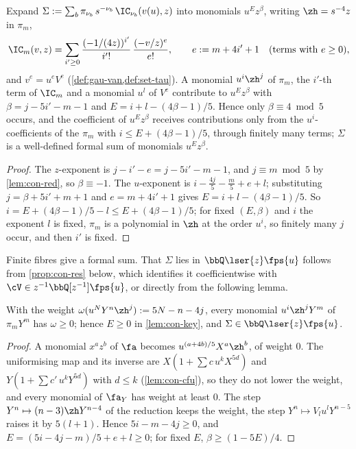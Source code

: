 
\begin{lem}
\label{lem:con-key}
Expand $\Sigma:=\sum_b\pi_{\nu_b}\,s^{-\nu_b}\,\IC_{\nu_b}(v(u),z)$ into monomials $u^Ez^\beta$, writing $\zh=s^{-4}z$ in $\pi_m$,
\[
\IC_m(v,z)=\sum_{i'\geq0}\frac{(-1/(4z))^{i'}}{i'!}\,\frac{(-v/z)^e}{e!},\qquad e:=m+4i'+1\quad(\text{terms with }e\geq0),
\]
and $v^e=u^eV^e$ (\cref{def:gau-van,def:set-tau}). A monomial $u^i\zh^j$ of $\pi_m$, the $i'$-th term of $\IC_m$ and a monomial $u^l$ of $V^e$ contribute to $u^Ez^\beta$ with $\beta=j-5i'-m-1$ and $E=i+l-(4\beta-1)/5$. Hence only $\beta\equiv4\bmod5$ occurs, and the coefficient of $u^Ez^\beta$ receives contributions only from the $u^i$-coefficients of the $\pi_m$ with $i\leq E+(4\beta-1)/5$, through finitely many terms; $\Sigma$ is a well-defined formal sum of monomials $u^Ez^\beta$.
\end{lem}

\begin{proof}
The $z$-exponent is $j-i'-e=j-5i'-m-1$, and $j\equiv m\bmod5$ by \cref{lem:con-red}, so $\beta\equiv-1$. The $u$-exponent is $i-\frac{4j}5-\frac m5+e+l$; substituting $j=\beta+5i'+m+1$ and $e=m+4i'+1$ gives $E=i+l-(4\beta-1)/5$. So $i=E+(4\beta-1)/5-l\leq E+(4\beta-1)/5$; for fixed $(E,\beta)$ and $i$ the exponent $l$ is fixed, $\pi_m$ is a polynomial in $\zh$ at the order $u^i$, so finitely many $j$ occur, and then $i'$ is fixed.
\end{proof}

Finite fibres give a formal sum. That $\Sigma$ lies in $\bbQ\lser{z}\fps{u}$ follows from \cref{prop:con-res} below, which identifies it coefficientwise with $\cV\in z^{-1}\bbQ[z^{-1}]\fps{u}$, or directly from the following lemma.

\begin{lem}
\label{lem:con-weight}
With the weight $\omega(u^NY^n\zh^j):=5N-n-4j$, every monomial $u^i\zh^jY^m$ of $\pi_mY^m$ has $\omega\geq0$; hence $E\geq0$ in \cref{lem:con-key}, and $\Sigma\in\bbQ\lser{z}\fps{u}$.
\end{lem}

\begin{proof}
A monomial $x^az^b$ of $\fa$ becomes $u^{(a+4b)/5}X^a\zh^b$, of weight $0$. The uniformising map and its inverse are $X(1+\sum c\,u^kX^{5d})$ and $Y(1+\sum c'\,u^kY^{5d})$ with $d\leq k$ (\cref{lem:con-cfu}), so they do not lower the weight, and every monomial of $\fa_Y$ has weight at least $0$. The step $Y^n\mapsto(n-3)\zh Y^{n-4}$ of the reduction keeps the weight, the step $Y^n\mapsto V_lu^lY^{n-5}$ raises it by $5(l+1)$. Hence $5i-m-4j\geq0$, and $E=(5i-4j-m)/5+e+l\geq0$; for fixed $E$, $\beta\geq(1-5E)/4$.
\end{proof}

